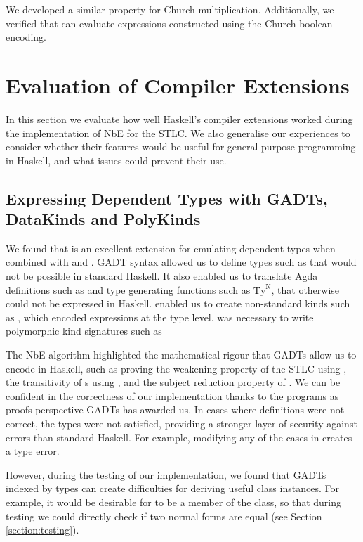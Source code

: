 We developed a similar property for Church multiplication. Additionally, we verified that  can evaluate expressions constructed using the Church boolean encoding.

\section{Evaluation of Compiler Extensions}

In this section we evaluate how well Haskell's compiler extensions worked during the implementation of NbE for the STLC. We also generalise our experiences to consider whether their features would be useful for general-purpose programming in Haskell, and what issues could prevent their use.

\subsection{Expressing Dependent Types with GADTs, DataKinds and PolyKinds}
\label{subsect:GADTanalysis}

We found that  is an excellent extension for emulating dependent types when combined with  and . GADT syntax allowed us to define types such as  that would not be possible in standard Haskell. It also enabled us to translate Agda  definitions such as  and type generating functions such as $\text{Ty}^\text{N}$, that otherwise could not be expressed in Haskell.  enabled us to create non-standard kinds such as , which encoded expressions at the type level.  was necessary to write polymorphic kind signatures such as 

The NbE algorithm highlighted the mathematical rigour that GADTs allow us to encode in Haskell, such as proving the weakening property of the STLC using , the transitivity of s using , and the subject reduction property of . We can be confident in the correctness of our implementation thanks to the programs as proofs perspective GADTs has awarded us. In cases where definitions were not correct, the types were not satisfied, providing a stronger layer of security against errors than standard Haskell. For example, modifying any of the cases in  creates a type error.

However, during the testing of our implementation, we found that GADTs indexed by types can create difficulties for deriving useful class instances. For example, it would be desirable for  to be a member of the  class, so that during testing we could directly check if two normal forms are equal (see Section \ref{section:testing}). 

